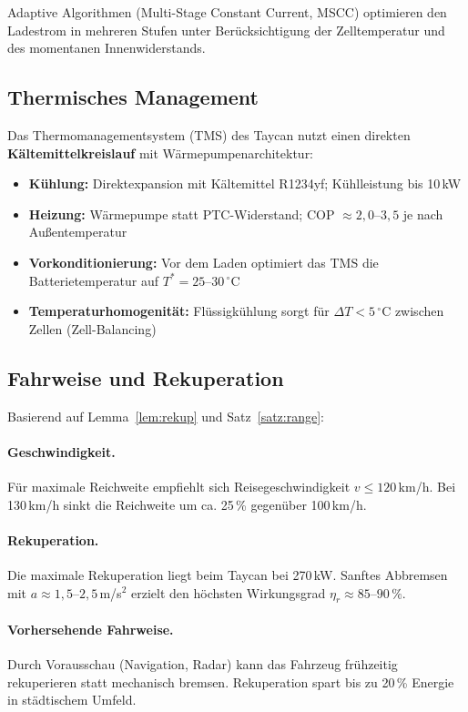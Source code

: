 ﻿\documentclass[a4paper,12pt]{article}
\theoremstyle{definition}
\begin{document}
Adaptive Algorithmen (Multi-Stage Constant Current, MSCC) optimieren den
Ladestrom in mehreren Stufen unter Ber\"ucksichtigung der Zelltemperatur
und des momentanen Innenwiderstands.

\subsection{Thermisches Management}

Das Thermomanagementsystem (TMS) des Taycan nutzt einen direkten
\textbf{K\"altemittelkreislauf} mit W\"armepumpenarchitektur:

\begin{itemize}
  \item \textbf{K\"uhlung:} Direktexpansion mit K\"altemittel R1234yf;
    Kühlleistung bis 10\,kW
  \item \textbf{Heizung:} W\"armepumpe statt PTC-Widerstand;
    COP $\approx 2{,}0$--$3{,}5$ je nach Au\ss{}entemperatur
  \item \textbf{Vorkonditionierung:} Vor dem Laden optimiert das TMS
    die Batterietemperatur auf $T^* = 25$--$30\,^{\circ}\mathrm{C}$
  \item \textbf{Temperaturhomogenit\"at:} Flüssigk\"uhlung sorgt für
    $\Delta T < 5\,^{\circ}\mathrm{C}$ zwischen Zellen (Zell-Balancing)
\end{itemize}

\subsection{Fahrweise und Rekuperation}

Basierend auf Lemma~\ref{lem:rekup} und Satz~\ref{satz:range}:

\paragraph{Geschwindigkeit.} F\"ur maximale Reichweite empfiehlt sich
Reisegeschwindigkeit $v \leq 120$\,km/h. Bei 130\,km/h sinkt die Reichweite
um ca. 25\,\% gegen\"uber 100\,km/h.

\paragraph{Rekuperation.} Die maximale Rekuperation liegt beim Taycan bei
270\,kW. Sanftes Abbremsen mit $a \approx 1{,}5$--$2{,}5$\,m/s$^2$ erzielt
den h\"ochsten Wirkungsgrad $\eta_r \approx 85$--$90\,\%$.

\paragraph{Vorhersehende Fahrweise.} Durch Vorausschau (Navigation, Radar)
kann das Fahrzeug fr\"uhzeitig rekuperieren statt mechanisch bremsen.
Rekuperation spart bis zu 20\,\% Energie in st\"adtischem Umfeld.
\end{document}
